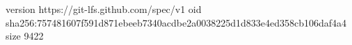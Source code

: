 version https://git-lfs.github.com/spec/v1
oid sha256:757481607f591d871ebeeb7340acdbe2a0038225d1d833e4ed358cb106daf4a4
size 9422
